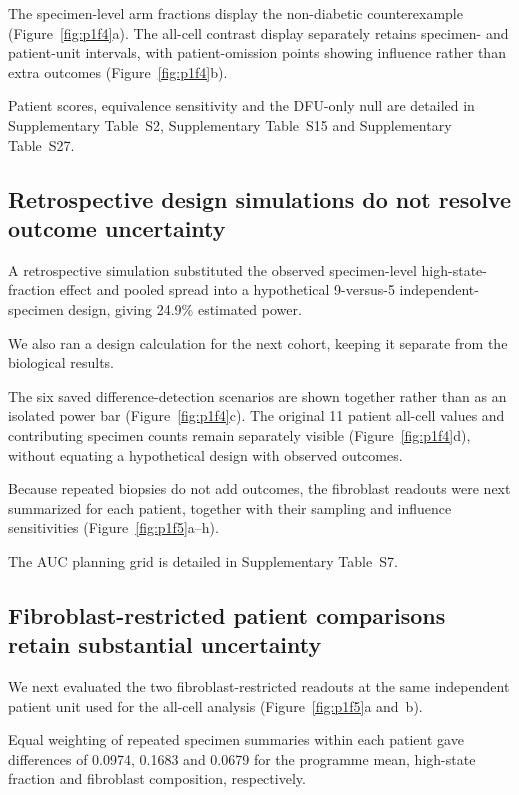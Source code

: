 \documentclass[10pt,a4paper]{article}
\begin{document}
The specimen-level arm fractions display the non-diabetic counterexample (Figure~\ref{fig:p1f4}a\label{call:p1f4}). The all-cell contrast display separately retains specimen- and patient-unit intervals, with patient-omission points showing influence rather than extra outcomes (Figure~\ref{fig:p1f4}b).



Patient scores, equivalence sensitivity and the DFU-only null are detailed in Supplementary Table~S2, Supplementary Table~S15 and Supplementary Table~S27.

\subsection{Retrospective design simulations do not resolve outcome uncertainty}

A retrospective simulation substituted the observed specimen-level high-state-fraction effect and pooled spread into a hypothetical 9-versus-5 independent-specimen design, giving 24.9\% estimated power.

We also ran a design calculation for the next cohort, keeping it separate from the biological results.

The six saved difference-detection scenarios are shown together rather than as an isolated power bar (Figure~\ref{fig:p1f4}c). The original 11 patient all-cell values and contributing specimen counts remain separately visible (Figure~\ref{fig:p1f4}d), without equating a hypothetical design with observed outcomes.

Because repeated biopsies do not add outcomes, the fibroblast readouts were next summarized for each patient, together with their sampling and influence sensitivities (Figure~\ref{fig:p1f5}a--h\label{call:p1f5}).

The AUC planning grid is detailed in Supplementary Table~S7.

\subsection{Fibroblast-restricted patient comparisons retain substantial uncertainty}



We next evaluated the two fibroblast-restricted readouts at the same independent patient unit used for the all-cell analysis (Figure~\ref{fig:p1f5}a and~b).

Equal weighting of repeated specimen summaries within each patient gave differences of 0.0974, 0.1683 and 0.0679 for the programme mean, high-state fraction and fibroblast composition, respectively.
\end{document}
